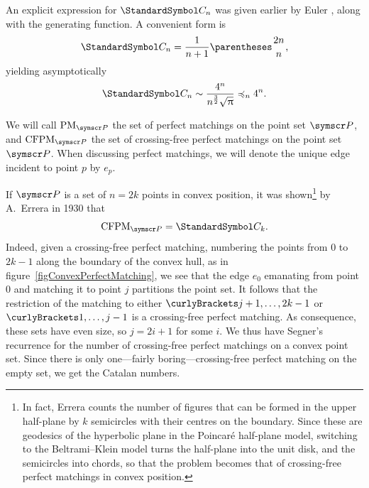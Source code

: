 An explicit expression for $\CatalanNumber n$ was given earlier by Euler \cite{Euler1751}, along
with the generating function.
A convenient form is\begin{equation}
\CatalanNumber n = \frac{1}{n+1} \binom {2n} {n}\text,
\end{equation}
yielding asymptotically
\begin{equation}
\CatalanNumber n \sim \frac{4^n}{n^{\frac{3}{2}}\sqrt{\Pi}} \preccurlyeq_n 4^n\text.
\end{equation}

\label{PerfectMatchingsIntro}
We will call $\PM_{\pointset P}$ the set of perfect matchings on the point set $\pointset P$,
and $\CFPM_{\pointset P}$ the set
of crossing-free perfect matchings on the point set $\pointset P$.
When discussing perfect matchings, we will denote the unique edge incident to point $p$ by
$e_p$.

If $\pointset P$ is a set of $n=2k$ points in convex position,
it was shown\footnote{In fact, Errera counts the number of figures that can be formed in the upper half-plane by $k$
semicircles with their centres on the boundary. Since these are geodesics of the hyperbolic plane in the Poincaré
half-plane model, switching to the Beltrami--Klein model turns the half-plane into the unit disk, and the semicircles
into chords, so that the problem becomes that of crossing-free perfect matchings in convex position.}
by A.~Errera in 1930 \cite{Errera1931} that\[\CFPM_{\pointset P}=\CatalanNumber k\text.\]
Indeed, given a crossing-free perfect matching,
numbering the points from $0$ to $2k-1$ along the boundary of the convex hull, as in figure~\ref{figConvexPerfectMatching},
we see that the edge $e_0$ emanating from point $0$ and matching it to point $j$ partitions
the point set. It follows that the restriction of the matching to either $\set{j+1,\dotsc,2k-1}$ or
$\set{1,\dotsc,j-1}$ is a crossing-free perfect matching.
As consequence, these sets have even size, so $j=2i+1$ for some $i$.
We thus have Segner's recurrence for the number of crossing-free perfect matchings on a convex point set.
Since there is only one---fairly boring---crossing-free perfect matching on the empty set, we get the Catalan numbers.

